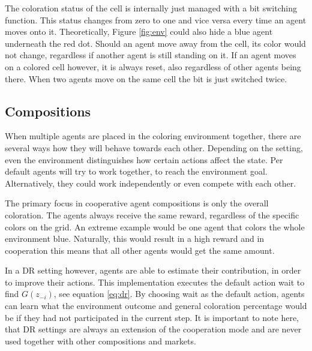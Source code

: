 The coloration status of the cell is internally just managed with a bit switching function. This status changes from zero to one and vice versa every time an agent moves onto it. Theoretically, Figure \ref{fig:env} could also hide a blue agent underneath the red dot. Should an agent move away from the cell, its color would not change, regardless if another agent is still standing on it. If an agent moves on a colored cell however, it is always reset, also regardless of other agents being there. When two agents move on the same cell the bit is just switched twice.



\subsection{Compositions}

When multiple agents are placed in the coloring environment together, there are several ways how they will behave towards each other. Depending on the setting, even the environment distinguishes how certain actions affect the state. Per default agents will try to work together, to reach the environment goal. Alternatively, they could work independently or even compete with each other.

The primary focus in cooperative agent compositions is only the overall coloration. The agents always receive the same reward, regardless of the specific colors on the grid. An extreme example would be one agent that colors the whole environment blue. Naturally, this would result in a high reward and in cooperation this means that all other agents would get the same amount. 

In a DR setting however, agents are able to estimate their contribution, in order to improve their actions. This implementation executes the default action wait to find $G(z_{-i})$, see equation \eqref{eq:dr}. By choosing wait as the default action, agents can learn what the environment outcome and general coloration percentage would be if they had not participated in the current step. It is important to note here, that DR settings are always an extension of the cooperation mode and are never used together with other compositions and markets.

